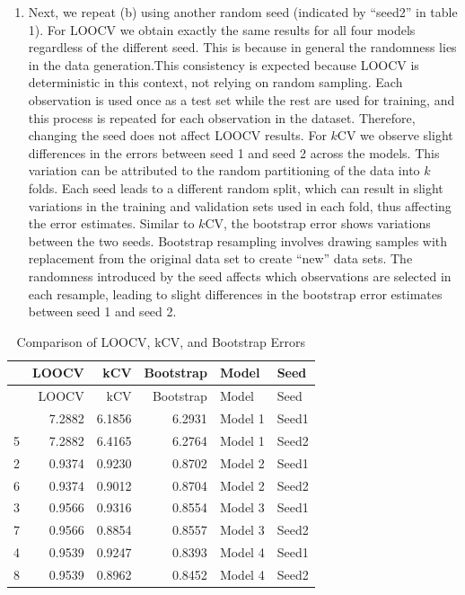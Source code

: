 \documentclass[
]{article}
\providecommand{\tightlist}{%
  \setlength{\itemsep}{0pt}\setlength{\parskip}{0pt}}
\begin{document}
\begin{enumerate}
\def\labelenumi{(\alph{enumi})}
\setcounter{enumi}{2}
\tightlist
\item
  Next, we repeat (b) using another random seed (indicated by ``seed2''
  in table 1). For LOOCV we obtain exactly the same results for all four
  models regardless of the different seed. This is because in general
  the randomness lies in the data generation.This consistency is
  expected because LOOCV is deterministic in this context, not relying
  on random sampling. Each observation is used once as a test set while
  the rest are used for training, and this process is repeated for each
  observation in the dataset. Therefore, changing the seed does not
  affect LOOCV results. For \(k\)CV we observe slight differences in the
  errors between seed 1 and seed 2 across the models. This variation can
  be attributed to the random partitioning of the data into \(k\) folds.
  Each seed leads to a different random split, which can result in
  slight variations in the training and validation sets used in each
  fold, thus affecting the error estimates. Similar to \(k\)CV, the
  bootstrap error shows variations between the two seeds. Bootstrap
  resampling involves drawing samples with replacement from the original
  data set to create ``new'' data sets. The randomness introduced by the
  seed affects which observations are selected in each resample, leading
  to slight differences in the bootstrap error estimates between seed 1
  and seed 2.
\end{enumerate}

\begin{longtable}[]{@{}lrrrll@{}}
\caption{Comparison of LOOCV, kCV, and Bootstrap Errors}\tabularnewline
\toprule\noalign{}
& LOOCV & kCV & Bootstrap & Model & Seed \\
\midrule\noalign{}
\endfirsthead
\toprule\noalign{}
& LOOCV & kCV & Bootstrap & Model & Seed \\
\midrule\noalign{}
\endhead
\bottomrule\noalign{}
\endlastfoot
1 & 7.2882 & 6.1856 & 6.2931 & Model 1 & Seed1 \\
5 & 7.2882 & 6.4165 & 6.2764 & Model 1 & Seed2 \\
2 & 0.9374 & 0.9230 & 0.8702 & Model 2 & Seed1 \\
6 & 0.9374 & 0.9012 & 0.8704 & Model 2 & Seed2 \\
3 & 0.9566 & 0.9316 & 0.8554 & Model 3 & Seed1 \\
7 & 0.9566 & 0.8854 & 0.8557 & Model 3 & Seed2 \\
4 & 0.9539 & 0.9247 & 0.8393 & Model 4 & Seed1 \\
8 & 0.9539 & 0.8962 & 0.8452 & Model 4 & Seed2 \\
\end{longtable}
\end{document}
